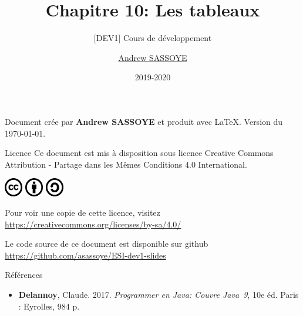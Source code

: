 \documentclass[utf8]{beamer}
\title{Chapitre 10: Les tableaux}
\subtitle{\tiny [DEV1] Cours de développement}
\author{\href{https://andrew.sassoye.be}{Andrew SASSOYE}}
\date{2019-2020}
\begin{document}
	\begin{frame}
		\titlepage
	\end{frame}

	\begin{frame}
        \center Document crée par \textbf{Andrew SASSOYE} et produit avec \LaTeX.
        \tiny Version du \today. \normalsize

		\begin{block}{Licence}
            Ce document est mis à disposition sous licence Creative Commons
            Attribution - Partage dans les Mêmes Conditions 4.0 International.

            \begin{center}
                \includegraphics[width=8mm]{./styles/images/cc}
                \includegraphics[width=8mm]{./styles/images/by}
                \includegraphics[width=8mm]{./styles/images/sa}
            \end{center}

            \center\tiny Pour voir une copie de cette licence, visitez
            \href{https://creativecommons.org/licenses/by-sa/4.0/}{https://creativecommons.org/licenses/by-sa/4.0/}
            \normalsize
        \end{block}

        \tiny Le code source de ce document est disponible sur github\\ \href{https://github.com/asassoye/ESI-dev1-slides}{https://github.com/asassoye/ESI-dev1-slides}

    \end{frame}

    \begin{frame}{Références}
        \begin{itemize}
            \item \textbf{Delannoy}, Claude. 2017. \textit{Programmer en Java: Couvre Java~9}, 10e éd. Paris : Eyrolles, 984 p.
        \end{itemize}
    \end{frame}
\end{document}

